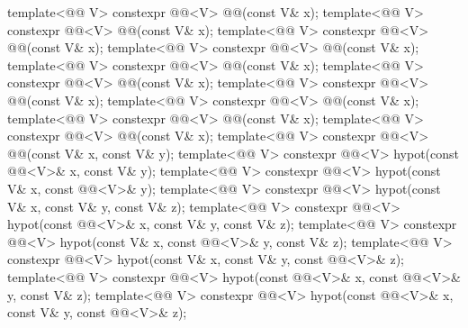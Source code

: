 \begin{itemdecl}
template<@@ V> constexpr @@<V> @@(const V& x);
template<@@ V> constexpr @@<V> @@(const V& x);
template<@@ V> constexpr @@<V> @@(const V& x);
template<@@ V> constexpr @@<V> @@(const V& x);
template<@@ V> constexpr @@<V> @@(const V& x);
template<@@ V> constexpr @@<V> @@(const V& x);
template<@@ V> constexpr @@<V> @@(const V& x);
template<@@ V> constexpr @@<V> @@(const V& x);
template<@@ V> constexpr @@<V> @@(const V& x);
template<@@ V> constexpr @@<V> @@(const V& x);
template<@@ V>
  constexpr @@<V> @@(const V& x, const V& y);
template<@@ V>
  constexpr @@<V> hypot(const @@<V>& x, const V& y);
template<@@ V>
  constexpr @@<V> hypot(const V& x, const @@<V>& y);
template<@@ V>
  constexpr @@<V> hypot(const V& x, const V& y, const V& z);
template<@@ V>
  constexpr @@<V> hypot(const @@<V>& x, const V& y, const V& z);
template<@@ V>
  constexpr @@<V> hypot(const V& x, const @@<V>& y, const V& z);
template<@@ V>
  constexpr @@<V> hypot(const V& x, const V& y, const @@<V>& z);
template<@@ V>
  constexpr @@<V>
    hypot(const @@<V>& x, const @@<V>& y, const V& z);
template<@@ V>
  constexpr @@<V>
    hypot(const @@<V>& x, const V& y, const @@<V>& z);

\end{itemdecl}
